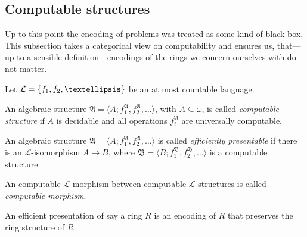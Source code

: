 
\subsection{Computable structures} \label{sec:computable structures}

Up to this point the encoding of problems was treated as some kind of black-box.
This subsection takes a categorical view on computability and ensures us,
that---up to a sensible definition---encodings of the rings we concern ourselves
with do not matter.

\begin{defin}
  Let $\mathcal{L} = \set{f_1, f_2, …}$ be an at most countable language.
  \begin{thmlist}
    \item An algebraic structure $\mathfrak A = ⟨A; f_1^{\mathfrak A},
    f_2^{\mathfrak A}, …⟩$, with $A \subseteq ω$, is called \emph{computable
    structure} if $A$ is decidable and all operations $f_i^{\mathfrak A}$ are
    universally computable.

    \item An algebraic structure $\mathfrak A = ⟨A; f_1^{\mathfrak A},
    f_2^{\mathfrak A}, …⟩$ is called \emph{efficiently presentable} if there
    is an $\mathcal L$-isomorphism $A → B$, where $\mathfrak B = ⟨B;
    f_1^{\mathfrak B}, f_2^{\mathfrak B}, …⟩$ is a computable structure.

    \item An computable $\mathcal L$-morphism between computable $\mathcal
    L$-structures is called \emph{computable morphism}.
  \end{thmlist}
\end{defin}

An efficient presentation of say a ring $R$ is an encoding of $R$ that preserves the ring structure of $R$.

